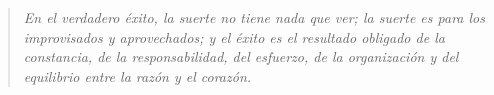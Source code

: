 \section*{}
	\begin{quote}
		{\it En el verdadero éxito, la suerte no tiene nada que ver; la suerte es para los improvisados y aprovechados; y el éxito es el resultado obligado de la constancia, de la responsabilidad, del esfuerzo, de la organización y del equilibrio entre la razón y el corazón.}
	\end{quote}